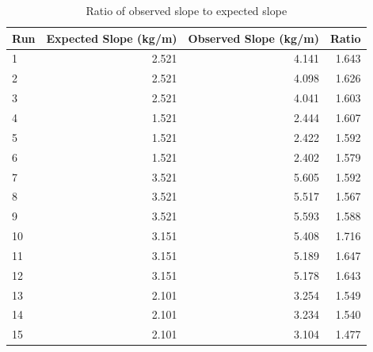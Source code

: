 %
\newpage
\begin{table}[ht]
    \centering
    \begin{tabular}{l|r|r|r}
        \textbf{Run} & \textbf{Expected Slope} (kg/m) & \textbf{Observed Slope} (kg/m) & \textbf{Ratio} \\
        \hline
        1 & 2.521 & 4.141 & 1.643 \\
        2 & 2.521 & 4.098 & 1.626 \\
        3 & 2.521 & 4.041 & 1.603 \\
        \hline
        4 & 1.521 & 2.444 & 1.607 \\
        5 & 1.521 & 2.422 & 1.592 \\
        6 & 1.521 & 2.402 & 1.579 \\
        \hline
        7 & 3.521 & 5.605 & 1.592 \\
        8 & 3.521 & 5.517 & 1.567 \\
        9 & 3.521 & 5.593 & 1.588 \\
        \hline
        10 & 3.151 & 5.408 & 1.716 \\
        11 & 3.151 & 5.189 & 1.647 \\
        12 & 3.151 & 5.178 & 1.643 \\
        \hline
        13 & 2.101 & 3.254 & 1.549 \\
        14 & 2.101 & 3.234 & 1.540 \\
        15 & 2.101 & 3.104 & 1.477 \\
        \hline
    \end{tabular}
    \caption{Ratio of observed slope to expected slope}
    \label{table.10.ratio}
\end{table}
%
\newpage
